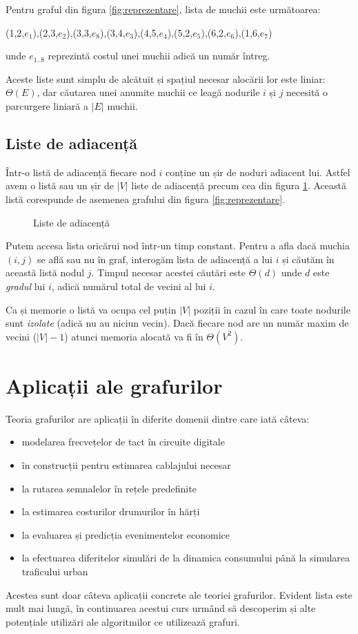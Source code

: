 Pentru graful din figura \ref{fig:reprezentare}, lista de muchii este următoarea:

{ (1,2,$e_1$),(2,3,$e_2$),(3,3,$e_8$),(3,4,$e_3$),(4,5,$e_4$),(5,2,$e_5$),(6,2,$e_6$),(1,6,$e_7$)}

unde $e_{1..8}$ reprezintă costul unei muchii adică un număr întreg.

Aceste liste sunt simplu de alcătuit și spațiul necesar alocării lor este liniar: $\Theta(E)$, dar căutarea unei anumite muchii ce leagă nodurile $i$ și $j$ necesită o parcurgere liniară a $\left |  E \right | $ muchii.

\subsection{Liste de adiacență}

Într-o listă de adiacență fiecare nod $i$ conține un șir de noduri adiacent lui. Astfel avem o listă sau un șir de $\left |  V \right | $ liste de adiacență precum cea din figura \ref{fig:adiacenta}. Această listă corespunde de asemenea grafului din figura \ref{fig:reprezentare}.


\begin{figure}[H] 
	\centering	
	{
	}
	\caption{Liste de adiacență} 
	\label{fig:adiacenta}
\end{figure}

Putem accesa lista oricărui nod într-un timp constant. Pentru a afla dacă muchia $(i,j)$ se află sau nu în graf, interogăm lista de adiacență a lui $i$ și căutăm în această listă nodul $j$. Timpul necesar acestei căutări este $\Theta(d)$ unde $d$ este \textit{gradul} lui $i$, adică numărul total de vecini al lui $i$.

Ca și memorie o listă va ocupa cel puțin  $\left |  V \right | $ poziții în cazul în care toate nodurile sunt \textit{izolate} (adică nu au niciun vecin). Dacă fiecare nod are un număr maxim de vecini ($\left |  V \right | -1 $) atunci memoria alocată va fi în $\Theta( V^2 )$.


\section{Aplicații ale grafurilor}

Teoria grafurilor are aplicații în diferite domenii dintre care iată câteva:


\begin{itemize}
	\item {modelarea frecvețelor de tact în circuite digitale}
	\item {în construcții pentru estimarea cablajului necesar}
	\item {la rutarea semnalelor în rețele predefinite}
	\item {la estimarea costurilor drumurilor în hărți}
	\item {la evaluarea și predicția evenimentelor economice}
	\item {la efectuarea diferitelor simulări de la dinamica consumului până la simularea traficului urban}	
\end{itemize}

Acestea sunt doar câteva aplicații concrete ale teoriei grafurilor. 
Evident lista este mult mai lungă, în continuarea acestui curs urmând să descoperim și alte potențiale utilizări ale algoritmilor ce utilizează grafuri.


